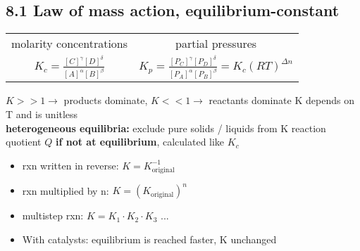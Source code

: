 \subsection{8.1 Law of mass action, equilibrium-constant}
    \begin{tabular}{c c}
        molarity concentrations & partial pressures\\
        $K_c = \frac{[C]^{\gamma} [D]^{\delta}}{[A]^{\alpha} [B]^{\beta}}$ & $K_p = \frac{[P_C]^{\gamma} [P_D]^{\delta}}{[P_A]^{\alpha} [P_B]^{\beta}} = K_c (RT)^{\Delta n}$
    \end{tabular}
    $K >> 1 \rightarrow$ products dominate, $K << 1 \rightarrow$ reactants dominate
    K depends on T and is unitless\\
    \textbf{heterogeneous equilibria:} exclude pure solids / liquids from K
    reaction quotient $Q$ \textbf{if not at equilibrium}, calculated like $K_c$
    \begin{itemize}
        \itemsep0em
        \item rxn written in reverse: $K = K^{-1}_{\textrm{original}}$
        \item rxn multiplied by n: $K = (K_{\textrm{original}})^n$
        \item multistep rxn: $K = K_1 \cdot K_2 \cdot K_3$ ...
        \item With catalysts: equilibrium is reached faster, K unchanged
    \end{itemize}